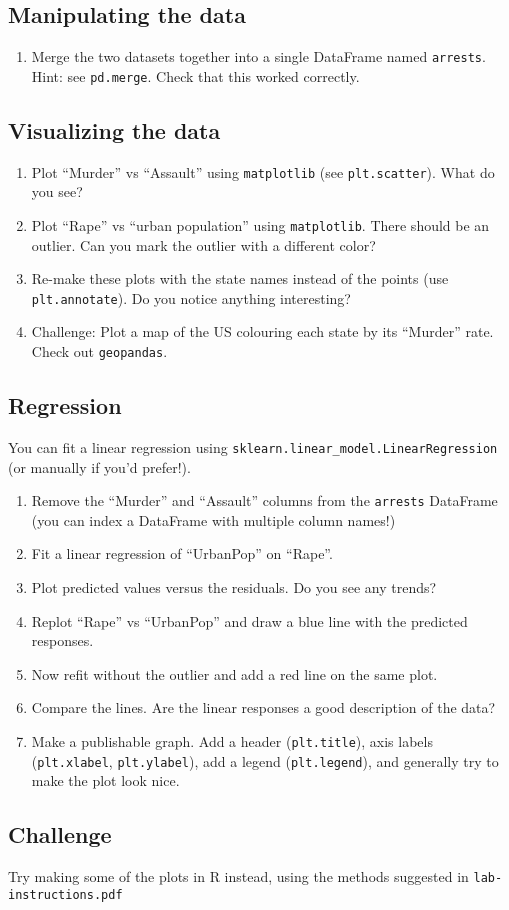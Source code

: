 \documentclass[letterpaper,12pt]{article}
\begin{document}
\subsection{Manipulating the data}
\begin{enumerate}
    \item Merge the two datasets together into a single DataFrame named \texttt{arrests}. Hint: see \texttt{pd.merge}. Check that this worked correctly.
\end{enumerate}
\subsection{Visualizing the data}
\begin{enumerate}
    \item Plot ``Murder'' vs ``Assault'' using \texttt{matplotlib} (see \texttt{plt.scatter}). What do you see?
    \item Plot ``Rape'' vs ``urban population'' using \texttt{matplotlib}. There should be an outlier. Can you mark the outlier with a different color?
    \item Re-make these plots with the state names instead of the points (use \texttt{plt.annotate}). Do you notice anything interesting?
    \item Challenge: Plot a map of the US colouring each state by its ``Murder'' rate. Check out \texttt{geopandas}.
\end{enumerate}
\subsection{Regression}
You can fit a linear regression using \texttt{sklearn.linear\_model.LinearRegression} (or manually if you'd prefer!).
\begin{enumerate}
    \item Remove the ``Murder'' and ``Assault'' columns from the \texttt{arrests} DataFrame (you can index a DataFrame with multiple column names!)
    \item Fit a linear regression of ``UrbanPop'' on ``Rape''.
    \item Plot predicted values versus the residuals. Do you see any trends?
    \item Replot ``Rape'' vs ``UrbanPop'' and draw a blue line with the predicted responses.
    \item Now refit without the outlier and add a red line on the same plot.
    \item Compare the lines. Are the linear responses a good description of the data?
    \item Make a publishable graph. Add a header (\texttt{plt.title}), axis labels (\texttt{plt.xlabel}, \texttt{plt.ylabel}), add a legend (\texttt{plt.legend}), and generally try to make the plot look nice.
\end{enumerate}

\subsection{Challenge}
Try making some of the plots in R instead, using the methods suggested in \texttt{lab-instructions.pdf}
\end{document}
